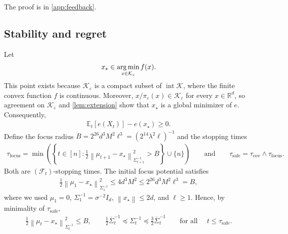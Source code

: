 \documentclass[11pt]{article}
\newcommand{\R}{\mathbb R}
\newcommand{\E}{\mathbb E}
\newcommand{\K}{\mathcal K}
\newcommand{\F}{\mathcal F}
\newcommand{\argmin}{\operatornamewithlimits{arg\,min}}
\newcommand{\1}{\mathbf 1}
\newcommand{\eps}{\varepsilon}
\newcommand{\norm}[1]{\left\lVert #1\right\rVert}
\newcommand{\normm}[2]{\left\lVert #1\right\rVert_{#2}}
\begin{document}
The proof is in \cref{app:feedback}.

\subsection{Stability and regret}
\label{sec:stability}

Let
\begin{align}
    x_\star\in\argmin_{x\in\K_\eps}f(x).
    \label{eq:xstar}
\end{align}
This point exists because $\K_\eps$ is a compact subset of
$\operatorname{int}\K$, where the finite convex function $f$ is continuous.
Moreover, $x/\pi_\eps(x)\in\K_\eps$ for every $x\in\R^d$, so agreement on
$\K_\eps$ and \eqref{lem:extension} show that $x_\star$ is a global
minimizer of $e$.  Consequently,
\begin{align}
    \E_t[e(X_t)]-e(x_\star)\geq0.
    \label{eq:stationarity-sign}
\end{align}
Define the focus radius
$B=2^{26}d^3M^2\ell^3=(2^{14}\lambda^2\ell)^{-1}$
and the stopping times
\begin{align}
    \tau_{\mathrm{focus}}
    =
    \min\left(
    \left\{
    t\in[n]:
    \frac12
    \normm{\mu_{t+1}-x_\star}{\Sigma_{t+1}^{-1}}^2>B
    \right\}
    \cup\{n\}
    \right)
    \qquad\text{and}\qquad
    \tau_{\mathrm{safe}}
    =
    \tau_{\mathrm{cov}}\wedge\tau_{\mathrm{focus}}.
    \label{eq:safe-stopping-time}
\end{align}
Both are $(\F_t)$-stopping times.
The initial focus potential satisfies
\begin{align}
    \frac12\normm{\mu_1-x_\star}{\Sigma_1^{-1}}^2
    \leq
    4d^3M^2
    \leq
    2^{26}d^3M^2\ell^3
    =B,
    \label{eq:initial-focus}
\end{align}
where we used $\mu_1=0$, $\Sigma_1^{-1}=\sigma^{-2}I_d$,
$\norm{x_\star}\leq2d$, and $\ell\geq1$.
Hence, by minimality of $\tau_{\mathrm{safe}}$,
\begin{align}
    \frac12\normm{\mu_t-x_\star}{\Sigma_t^{-1}}^2
    \leq B,
    \qquad
    \frac12\overline\Sigma_t^{-1}
    \preceq\Sigma_t^{-1}
    \preceq\frac32\overline\Sigma_t^{-1}
    \qquad
    \text{for all }\quad
    t\leq\tau_{\mathrm{safe}}.
    \label{eq:stability-stopped-invariants}
\end{align}
\end{document}

